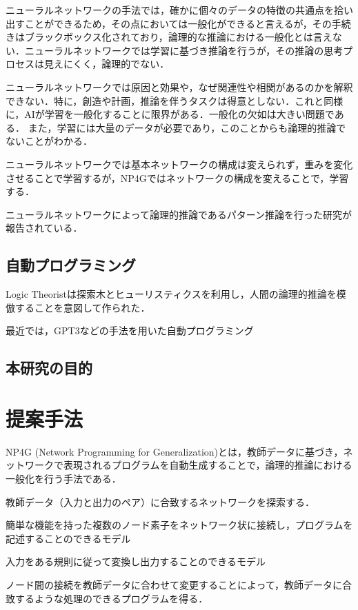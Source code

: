 \documentclass[exploratorypaper]{jsaiart} %
\begin{document}
ニューラルネットワークの手法では，確かに個々のデータの特徴の共通点を拾い出すことができるため，その点においては一般化ができると言えるが，その手続きはブラックボックス化されており，論理的な推論における一般化とは言えない．ニューラルネットワークでは学習に基づき推論を行うが，その推論の思考プロセスは見えにくく，論理的でない．

ニューラルネットワークでは原因と効果や，なぜ関連性や相関があるのかを解釈できない．特に，創造や計画，推論を伴うタスクは得意としない．これと同様に，AIが学習を一般化することに限界がある．一般化の欠如は大きい問題である．
また，学習には大量のデータが必要であり，このことからも論理的推論でないことがわかる．

ニューラルネットワークでは基本ネットワークの構成は変えられず，重みを変化させることで学習するが，NP4Gではネットワークの構成を変えることで，学習する．

ニューラルネットワークによって論理的推論であるパターン推論を行った研究が報告されている\cite{tsukimoto:00}\cite{sudo:07}．


\subsection{自動プログラミング}
Logic Theorist\cite{LogicTheorist}は探索木とヒューリスティクスを利用し，人間の論理的推論を模倣することを意図して作られた．

最近では，GPT3などの手法を用いた自動プログラミング

\subsection{本研究の目的}


\section{提案手法}
NP4G (Network Programming for Generalization)とは，教師データに基づき，ネットワークで表現されるプログラムを自動生成することで，論理的推論における一般化を行う手法である．

教師データ（入力と出力のペア）に合致するネットワークを探索する．

簡単な機能を持った複数のノード素子をネットワーク状に接続し，プログラムを記述することのできるモデル

入力をある規則に従って変換し出力することのできるモデル

ノード間の接続を教師データに合わせて変更することによって，教師データに合致するような処理のできるプログラムを得る．
\end{document}
